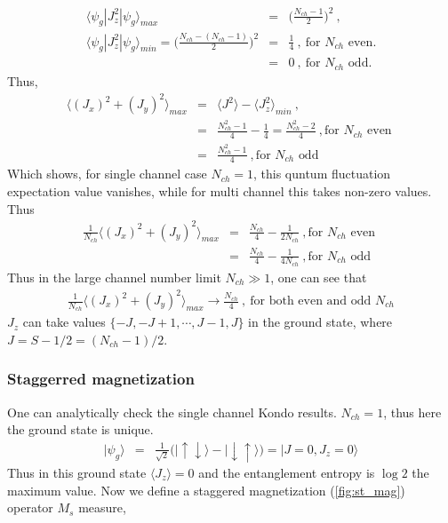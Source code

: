 \documentclass[reprint,prb,superscriptaddress]{revtex4-1}
\begin{document}
\begin{eqnarray}
\langle \psi_g | J_{z}^2 | \psi_g \rangle_{max} &=& \bigg(\frac{N_{ch}-1}{2}\bigg)^2~,\nonumber\\
\langle \psi_g | J_{z}^2 | \psi_g \rangle_{min} = \bigg(\frac{N_{ch}-(N_{ch}-1)}{2}\bigg)^2&=&\frac{1}{4}~,~\textrm{for $N_{ch}$ even}.\nonumber\\
&=& 0 ~,~\textrm{for $N_{ch}$ odd}.
\end{eqnarray}
Thus,
\begin{eqnarray}
\langle (J_x)^2+(J_y)^2 \rangle_{max}&=&\langle J^2 \rangle - \langle J_z^2 \rangle_{min} ~,\nonumber\\
&=& \frac{N_{ch}^2-1}{4}-\frac{1}{4}=\frac{N_{ch}^2-2}{4}~, \textrm{for $N_{ch}$ even } \nonumber\\
&=& \frac{N_{ch}^2-1}{4}~, \textrm{for $N_{ch}$ odd } \nonumber
\end{eqnarray}
Which shows, for single channel case $N_{ch}=1$, this quntum fluctuation expectation value vanishes, while for multi channel this takes non-zero values. Thus 
\begin{eqnarray}
\frac{1}{N_{ch}}\langle (J_x)^2+(J_y)^2 \rangle_{max}
&=& \frac{N_{ch}}{4}-\frac{1}{2N_{ch}}  ~, \textrm{for $N_{ch}$ even } \nonumber\\
&=& \frac{N_{ch}}{4}-\frac{1}{4N_{ch}}~, \textrm{for $N_{ch}$ odd } \nonumber
\end{eqnarray}
Thus in the large channel number limit $N_{ch}\gg 1$, one can see that 
\begin{eqnarray}
\frac{1}{N_{ch}}\langle (J_x)^2+(J_y)^2 \rangle_{max}
\rightarrow \frac{N_{ch}}{4}~,~\textrm{for both even and odd $N_{ch}$}
\end{eqnarray}
\noindent $J_z$ can take values $\{-J,-J+1,\cdots,J-1,J\}$ in the ground state, where $J=S-1/2=(N_{ch}-1)/2$.




\subsubsection{Staggerred magnetization}
One can analytically check the single channel Kondo results. $N_{ch}=1$, thus here the ground state is unique.
\begin{eqnarray}
|\psi_g\rangle &=& \frac{1}{\sqrt{2}} \bigg(|\uparrow\downarrow\rangle-|\downarrow\uparrow\rangle\bigg)= |J=0,J_z=0\rangle
\end{eqnarray}
Thus in this ground state $\langle J_z \rangle=0$ and the  entanglement entropy is $\log 2$ the maximum value. Now we define a staggered magnetization (\ref{fig:st_mag}) operator $M_s$ measure,
\end{document}
